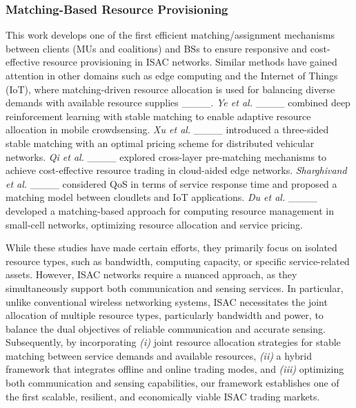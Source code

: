 \subsubsection{Matching-Based Resource Provisioning}
This work develops one of the first efficient matching/assignment mechanisms between clients (MUs and coalitions) and BSs to ensure responsive and cost-effective resource provisioning in ISAC networks. Similar methods have gained attention in other domains such as edge computing and the Internet of Things (IoT), where matching-driven resource allocation is used for balancing diverse demands with available resource supplies ____. \textit{Ye et al.} ____ combined deep reinforcement learning with stable matching to enable adaptive resource allocation in mobile crowdsensing. \textit{Xu et al.} ____ introduced a three-sided stable matching with an optimal pricing scheme for distributed vehicular networks. \textit{Qi et al.} ____ explored cross-layer pre-matching mechanisms to achieve cost-effective resource trading in cloud-aided edge networks. \textit{Sharghivand et al.} ____ considered QoS in terms of service response time and proposed a matching model between cloudlets and IoT applications. \textit{Du et al.} ____ developed a matching-based approach for computing resource management in small-cell networks, optimizing resource allocation and service pricing.

While these studies have made certain efforts, they primarily focus on isolated resource types, such as bandwidth, computing capacity, or specific service-related assets. However, ISAC networks require a nuanced approach, as they simultaneously support both communication and sensing services. In particular, unlike conventional wireless networking systems, ISAC necessitates the joint allocation of multiple resource types, particularly bandwidth and power, to balance the dual objectives of reliable communication and accurate sensing. Subsequently, by incorporating \textit{(i)} joint resource allocation strategies for stable matching between service demands and available resources, \textit{(ii)} a hybrid framework that integrates offline and online trading modes, and \textit{(iii)} optimizing both communication and sensing capabilities, our framework establishes one of the first scalable, resilient, and economically viable ISAC trading markets.

\vspace{-4mm}